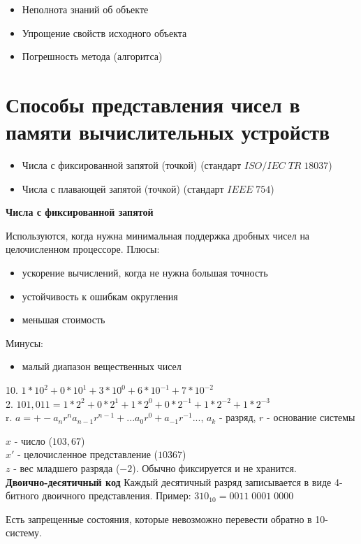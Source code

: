 \documentclass[a4paper,12pt]{report}
\begin{document}
\begin{itemize}
\item Неполнота знаний об объекте 
\item  Упрощение свойств исходного объекта
\item Погрешность метода (алгоритса)
\end{itemize}


\section{Способы представления чисел в памяти вычислительных устройств}
\begin{itemize}
\item Числа с фиксированной запятой (точкой) (стандарт $ISO/IEC\;TR\;18037$)
\item Числа с плавающей запятой (точкой) (стандарт $IEEE\;754$)
\end{itemize}

\textbf{Числа с фиксированной запятой}

Используются, когда нужна минимальная поддержка дробных чисел на целочисленном процессоре.
Плюсы:
\begin{itemize}
\item ускорение вычислений, когда не нужна большая точность
\item устойчивость к ошибкам округления
\item меньшая стоимость
\end{itemize}
Минусы:
\begin{itemize}
\item малый диапазон вещественных чисел
\end{itemize}

10. $1*10^2+0*10^1+3*10^0+6*10^{-1}+7*10^{-2}$\\
2. $101,011=1*2^2+0*2^1+1*2^0+0*2^{-1}+1*2^{-2}+1*2^{-3}$\\
r. $a=+-a_n r^na_{n-1} r^{n-1}+...a_0r^0+a_{-1}r^{-1}...$, $a_k$ - разряд, $r$ - основание системы

$x$ - число ($103,67$)\\
$x'$ - целочисленное представление ($10367$)\\
$z$ - вес младшего разряда ($-2$). Обычно фиксируется и не хранится.\\

\textbf{Двоично-десятичный код}
Каждый десятичный разряд записывается в виде 4-битного двоичного представления.
Пример: $310_{10}=0011\;0001\;0000$

Есть запрещенные состояния, которые невозможно перевести обратно в 10-систему.
\end{document}
